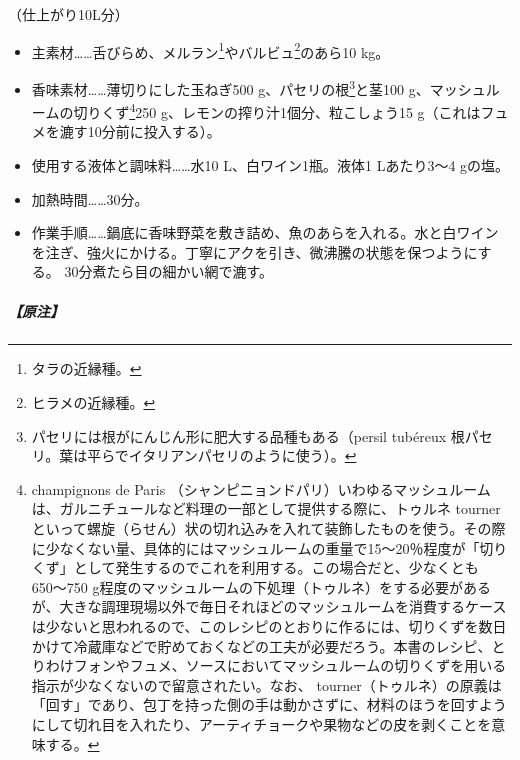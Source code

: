 \begin{recette}

 

（仕上がり10L分）

\begin{itemize}
\item
  主素材\ldots{}\ldots{}舌びらめ、メルラン\footnote{タラの近縁種。}やバルビュ\footnote{ヒラメの近縁種。}のあら10
  kg。
\item
  香味素材\ldots{}\ldots{}薄切りにした玉ねぎ500 g、パセリの根\footnote{パセリには根がにんじん形に肥大する品種もある（persil
    tubéreux 根パセリ。葉は平らでイタリアンパセリのように使う）。}と茎100
  g、マッシュルームの切りくず\footnote{champignons de Paris
    （シャンピニョンドパリ）いわゆるマッシュルームは、ガルニチュールなど料理の一部として提供する際に、トゥルネ
    tourner
    といって螺旋（らせん）状の切れ込みを入れて装飾したものを使う。その際に少なくない量、具体的にはマッシュルームの重量で15〜20％程度が「切りくず」として発生するのでこれを利用する。この場合だと、少なくとも650〜750
    g程度のマッシュルームの下処理（トゥルネ）をする必要があるが、大きな調理現場以外で毎日それほどのマッシュルームを消費するケースは少ないと思われるので、このレシピのとおりに作るには、切りくずを数日かけて冷蔵庫などで貯めておくなどの工夫が必要だろう。本書のレシピ、とりわけフォンやフュメ、ソースにおいてマッシュルームの切りくずを用いる指示が少なくないので留意されたい。なお、
    tourner（トゥルネ）の原義は「回す」であり、包丁を持った側の手は動かさずに、材料のほうを回すようにして切れ目を入れたり、アーティチョークや果物などの皮を剥くことを意味する。}250
  g、レモンの搾り汁1個分、粒こしょう15
  g（これはフュメを漉す10分前に投入する）。
\item
  使用する液体と調味料\ldots{}\ldots{}水10 L、白ワイン1瓶。液体1
  Lあたり3〜4 gの塩。
\item
  加熱時間\ldots{}\ldots{}30分。
\item
  作業手順\ldots{}\ldots{}鍋底に香味野菜を敷き詰め、魚のあらを入れる。水と白ワインを注ぎ、強火にかける。丁寧にアクを引き、微沸騰の状態を保つようにする。
  30分煮たら目の細かい網で漉す。
\end{itemize}

\hypertarget{nota-fumet-de-poisson}{%
\subparagraph{【原注】}\label{nota-fumet-de-poisson}}


\end{recette}
